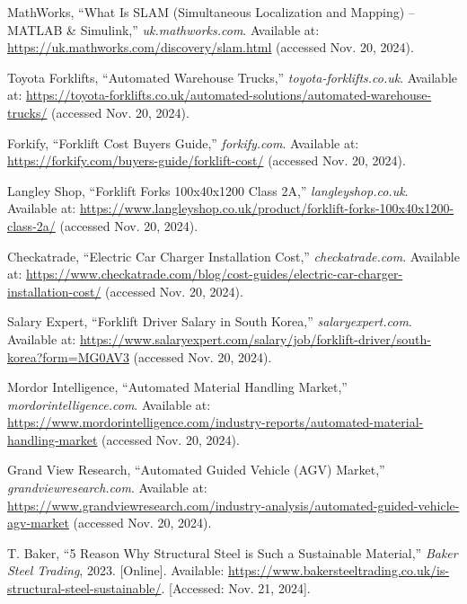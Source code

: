 \documentclass[12pt]{article}
\begin{document}
\begin{thebibliography}{99}
\footnotesize
\setlength{\baselineskip}{0.8\baselineskip}

MathWorks, “What Is SLAM (Simultaneous Localization and Mapping) – MATLAB \& Simulink,” \textit{uk.mathworks.com}.  
Available at: \url{https://uk.mathworks.com/discovery/slam.html} (accessed Nov. 20, 2024).
 

Toyota Forklifts, “Automated Warehouse Trucks,” \textit{toyota-forklifts.co.uk}.  
Available at: \url{https://toyota-forklifts.co.uk/automated-solutions/automated-warehouse-trucks/} (accessed Nov. 20, 2024).

Forkify, “Forklift Cost Buyers Guide,” \textit{forkify.com}.  
Available at: \url{https://forkify.com/buyers-guide/forklift-cost/} (accessed Nov. 20, 2024).


Langley Shop, “Forklift Forks 100x40x1200 Class 2A,” \textit{langleyshop.co.uk}.  
Available at: \url{https://www.langleyshop.co.uk/product/forklift-forks-100x40x1200-class-2a/} (accessed Nov. 20, 2024).

Checkatrade, “Electric Car Charger Installation Cost,” \textit{checkatrade.com}.  
Available at: \url{https://www.checkatrade.com/blog/cost-guides/electric-car-charger-installation-cost/} (accessed Nov. 20, 2024).

Salary Expert, “Forklift Driver Salary in South Korea,” \textit{salaryexpert.com}.  
Available at: \url{https://www.salaryexpert.com/salary/job/forklift-driver/south-korea?form=MG0AV3} (accessed Nov. 20, 2024).

Mordor Intelligence, “Automated Material Handling Market,” \textit{mordorintelligence.com}.  
Available at: \url{https://www.mordorintelligence.com/industry-reports/automated-material-handling-market} (accessed Nov. 20, 2024).

Grand View Research, “Automated Guided Vehicle (AGV) Market,” \textit{grandviewresearch.com}.  
Available at: \url{https://www.grandviewresearch.com/industry-analysis/automated-guided-vehicle-agv-market} (accessed Nov. 20, 2024).

 T. Baker, ``5 Reason Why Structural Steel is Such a Sustainable Material,'' \textit{Baker Steel Trading}, 2023. [Online]. Available: \url{https://www.bakersteeltrading.co.uk/is-structural-steel-sustainable/}. [Accessed: Nov. 21, 2024].


\end{thebibliography}
\end{document}
